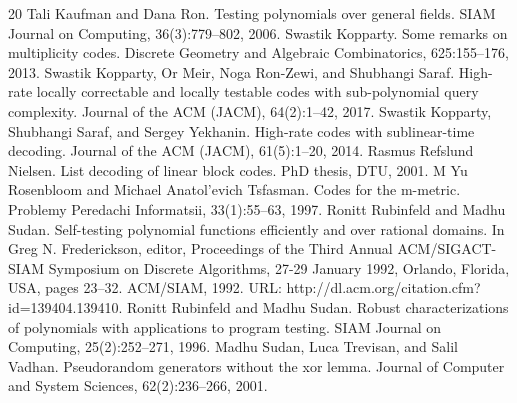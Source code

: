 \documentclass[10pt,a4paper]{article}
\begin{document}
\begin{thebibliography}{20}
 Tali Kaufman and Dana Ron. Testing polynomials over general fields. SIAM Journal on Computing, 36(3):779–802, 2006.
 Swastik Kopparty. Some remarks on multiplicity codes. Discrete Geometry and Algebraic Combinatorics, 625:155–176, 2013.
 Swastik Kopparty, Or Meir, Noga Ron-Zewi, and Shubhangi Saraf. High-rate locally correctable and locally testable codes with sub-polynomial query complexity. Journal of the ACM (JACM), 64(2):1–42, 2017.
 Swastik Kopparty, Shubhangi Saraf, and Sergey Yekhanin. High-rate codes with sublinear-time decoding. Journal of the ACM (JACM), 61(5):1–20, 2014.
 Rasmus Refslund Nielsen. List decoding of linear block codes. PhD thesis, DTU, 2001.
 M Yu Rosenbloom and Michael Anatol’evich Tsfasman. Codes for the m-metric. Problemy Peredachi Informatsii, 33(1):55–63, 1997.
 Ronitt Rubinfeld and Madhu Sudan. Self-testing polynomial functions efficiently and over rational domains. In Greg N. Frederickson, editor, Proceedings of the Third Annual ACM/SIGACT-SIAM Symposium on Discrete Algorithms, 27-29 January 1992, Orlando, Florida, USA, pages 23–32. ACM/SIAM, 1992. URL: http://dl.acm.org/citation.cfm?id=139404.139410.
 Ronitt Rubinfeld and Madhu Sudan. Robust characterizations of polynomials with applications to program testing. SIAM Journal on Computing, 25(2):252–271, 1996.
 Madhu Sudan, Luca Trevisan, and Salil Vadhan. Pseudorandom generators without the xor lemma. Journal of Computer and System Sciences, 62(2):236–266, 2001.
\end{thebibliography}
\end{document}
